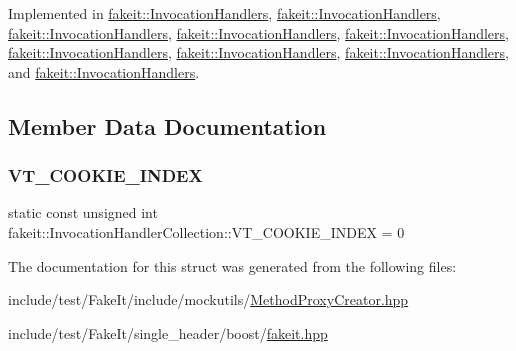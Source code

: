 Implemented in \mbox{\hyperlink{classfakeit_1_1InvocationHandlers_a47af368f009fc5e3cce950ebbab4c48d}{fakeit\+::\+Invocation\+Handlers}}, \mbox{\hyperlink{classfakeit_1_1InvocationHandlers_a47af368f009fc5e3cce950ebbab4c48d}{fakeit\+::\+Invocation\+Handlers}}, \mbox{\hyperlink{classfakeit_1_1InvocationHandlers_a47af368f009fc5e3cce950ebbab4c48d}{fakeit\+::\+Invocation\+Handlers}}, \mbox{\hyperlink{classfakeit_1_1InvocationHandlers_a47af368f009fc5e3cce950ebbab4c48d}{fakeit\+::\+Invocation\+Handlers}}, \mbox{\hyperlink{classfakeit_1_1InvocationHandlers_a47af368f009fc5e3cce950ebbab4c48d}{fakeit\+::\+Invocation\+Handlers}}, \mbox{\hyperlink{classfakeit_1_1InvocationHandlers_a47af368f009fc5e3cce950ebbab4c48d}{fakeit\+::\+Invocation\+Handlers}}, \mbox{\hyperlink{classfakeit_1_1InvocationHandlers_a47af368f009fc5e3cce950ebbab4c48d}{fakeit\+::\+Invocation\+Handlers}}, \mbox{\hyperlink{classfakeit_1_1InvocationHandlers_a47af368f009fc5e3cce950ebbab4c48d}{fakeit\+::\+Invocation\+Handlers}}, and \mbox{\hyperlink{classfakeit_1_1InvocationHandlers_a47af368f009fc5e3cce950ebbab4c48d}{fakeit\+::\+Invocation\+Handlers}}.



\subsection{Member Data Documentation}
\mbox{\label{structfakeit_1_1InvocationHandlerCollection_ace5066f18e42ab8c3d338c72c9e3d887}} 
\subsubsection{\texorpdfstring{VT\_COOKIE\_INDEX}{VT\_COOKIE\_INDEX}}
{\footnotesize\ttfamily static const unsigned int fakeit\+::\+Invocation\+Handler\+Collection\+::\+V\+T\+\_\+\+C\+O\+O\+K\+I\+E\+\_\+\+I\+N\+D\+EX = 0\hspace{0.3cm}{\ttfamily [static]}}



The documentation for this struct was generated from the following files\+:\begin{DoxyCompactItemize}
\item 
include/test/\+Fake\+It/include/mockutils/\mbox{\hyperlink{MethodProxyCreator_8hpp}{Method\+Proxy\+Creator.\+hpp}}\item 
include/test/\+Fake\+It/single\+\_\+header/boost/\mbox{\hyperlink{single__header_2boost_2fakeit_8hpp}{fakeit.\+hpp}}\end{DoxyCompactItemize}
